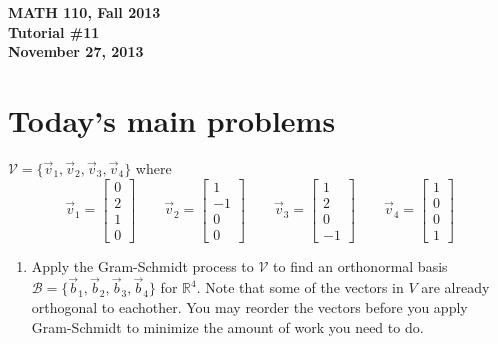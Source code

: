 \documentclass[11pt]{exam}
\newcommand{\R}{\mathbb{R}}
\newcommand{\mat}[1]{\begin{bmatrix}#1\end{bmatrix}}
\newcommand{\mthCourse}{MATH 110}
\newcommand{\mthTerm}{Fall 2013}
\newcommand{\mthTutorialNumber}{11}
\newcommand{\mthDate}{November 27, 2013}
\begin{document}
{\large
	\begin{center}
		{\bf \mthCourse, \mthTerm}\\ 
		{\bf Tutorial \#\mthTutorialNumber}\\
		{\bf \mthDate}
	\end{center}
}

\section*{Today's main problems}
		$\mathcal V=\{\vec v_1,\vec v_2,\vec v_3, \vec v_4\}$ where
		\[
			\vec v_1=\mat{0\\2\\1\\0}\qquad
			\vec v_2=\mat{1\\-1\\0\\0}\qquad
			\vec v_3=\mat{1\\2\\0\\-1}\qquad
			\vec v_4=\mat{1\\0\\0\\1}
		\]
\begin{enumerate}
	\item Apply the Gram-Schmidt process to $\mathcal V$ to find an orthonormal
		basis $\mathcal B=\{\vec b_1,\vec b_2,\vec b_3,\vec b_4\}$
		for $\R^4$.  Note that some of the vectors in $V$
		are already orthogonal to eachother.  You may reorder the vectors
		before you apply Gram-Schmidt to minimize the amount of work
		you need to do.

\end{enumerate}
\end{document}
